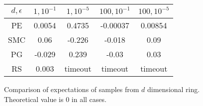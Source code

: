\begin{figure}
\begin{center}
	\begin{tabular}{||c| c c c c||} 
	\hline
	 $d,\epsilon$& $1, {10^{-1}}$ & $1, {10^{-5}}$ & ${100}, {10^{-1}}$ & ${100}, {10^{-5}}$ \\ [0.5ex] 
	\hline\hline
	PE & 0.0054 & 0.4735  & -0.00037 & 0.00854\\ 
	\hline
	SMC & 0.06 & -0.226  & -0.018 & 0.09\\ 
	\hline
	PG & -0.029 & 0.239 & -0.03 & 0.03\\
	\hline
	RS & 0.003 & timeout & timeout & timeout \\
	\hline
 \end{tabular}
 \label{results}
 \caption{Comparison of expectations of samples from $d$ dimensional ring.  Theoretical value is 0 in all cases.}
 \end{center}
\end{figure}


  